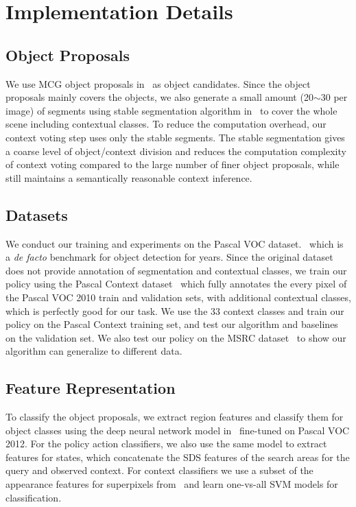 \section{Implementation Details}
\subsection{Object Proposals}
We use MCG object proposals in~\cite{arbelaez2014multiscale} as object candidates. Since the object proposals mainly covers the objects,  we also generate a small amount (20$\sim$30 per image) of segments using stable segmentation algorithm in~\cite{chen2011piecing} to cover the whole scene including contextual classes. To reduce the computation overhead, our context voting step uses only the stable segments. The stable segmentation gives a coarse level of object/context division and reduces the computation complexity of context voting compared to the large number of finer object proposals, while still maintains a semantically reasonable context inference. 

\subsection{Datasets}
We conduct our training and experiments on the Pascal VOC dataset.~\cite{Everingham10} which is a \textit{de facto} benchmark for object detection for years. Since the original dataset does not provide annotation of segmentation and contextual classes, we train our policy using the Pascal Context dataset~\cite{mottaghi2014role} which fully annotates the every pixel of the Pascal VOC 2010 train and validation sets, with additional contextual classes, which is perfectly good for our task. We use the 33 context classes and train our policy on the Pascal Context training set, and test our algorithm and baselines on the validation set. We also test our policy on the MSRC dataset~\cite{shotton2006textonboost} to show our algorithm can generalize to different data. 

\subsection{Feature Representation}
To classify the object proposals, we extract region features and classify them for object classes using the deep neural network model in~\cite{BharathECCV2014} fine-tuned on Pascal VOC 2012. For the policy action classifiers, we also use the same model to extract features for states, which concatenate the SDS features of the search areas for the query and observed context. For context classifiers we use a subset of the appearance features for superpixels from~\cite{tighe2010superparsing} and learn one-vs-all SVM models for classification.


